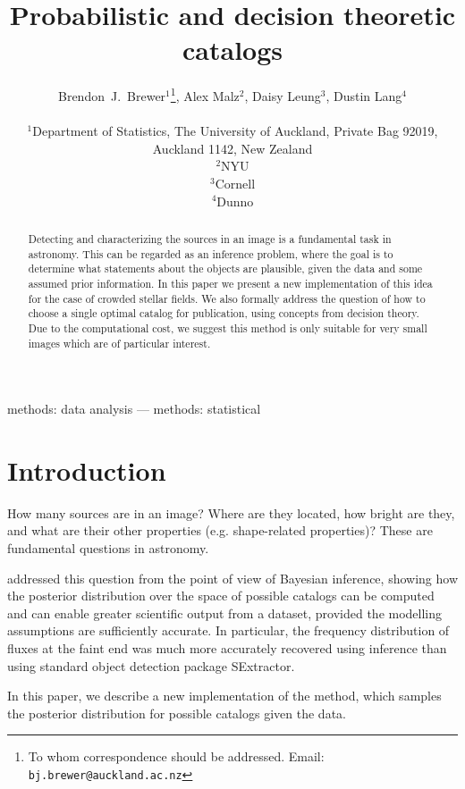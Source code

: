 \documentclass[a4paper,fleqn,usenatbib]{mnras}
\title[]
{Probabilistic and decision theoretic catalogs}
\author[Brewer, Malz, Leung, and Lang]{%
  Brendon~J.~Brewer$^{1}$\thanks{To whom correspondence should be addressed. Email: {\tt bj.brewer@auckland.ac.nz}}, Alex Malz$^2$, Daisy Leung$^3$, Dustin Lang$^4$\\
  \medskip\\
  $^1$Department of Statistics, The University of Auckland, Private Bag 92019,
        Auckland 1142, New Zealand\\
  $^2$NYU\\
  $^3$Cornell\\
  $^4$Dunno}
\date{}
\begin{document}
\label{firstpage}
\pagerange{\pageref{firstpage}--\pageref{lastpage}}
\maketitle

\begin{abstract}
Detecting and characterizing the sources in an image is a fundamental task
in astronomy. This can be regarded as an inference problem, where the goal
is to determine what statements about the objects are plausible, given the
data and some assumed prior information. In this paper we present a new
implementation of this idea for the case of crowded stellar fields.
We also formally address the question of how to choose a single optimal
catalog for publication, using concepts from decision theory.
Due to the computational cost, we suggest this method is only suitable for
very small images which are of particular interest.
\end{abstract}

\begin{keywords}
methods: data analysis --- methods: statistical
\end{keywords}



\section{Introduction}
How many sources are in an image? Where are they located, how bright are they,
and what are their other properties (e.g. shape-related properties)? These
are fundamental questions in astronomy.


\citet{brewer2013probabilistic} addressed this question from the point of view
of Bayesian inference, showing how the posterior distribution over the space of possible catalogs can be computed and can enable greater scientific output from
a dataset, provided the modelling assumptions are sufficiently accurate. In
particular, the frequency distribution of fluxes at the faint end was much
more accurately recovered using inference than using standard object detection
package SExtractor.

In this paper, we describe a new implementation of the
\citet{brewer2013probabilistic}
method, which samples the posterior distribution for possible catalogs
given the data. 
\end{document}
